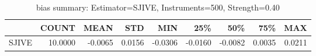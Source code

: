 \begin{table}[ht]
\centering
\caption{bias summary: Estimator=SJIVE, Instruments=500, Strength=0.40}
\begin{tabular}{lrrrrrrrr}
\toprule
 & COUNT & MEAN & STD & MIN & 25\% & 50\% & 75\% & MAX \\
\midrule
SJIVE & 10.0000 & -0.0065 & 0.0156 & -0.0306 & -0.0160 & -0.0082 & 0.0035 & 0.0211 \\
\bottomrule
\end{tabular}
\end{table}
